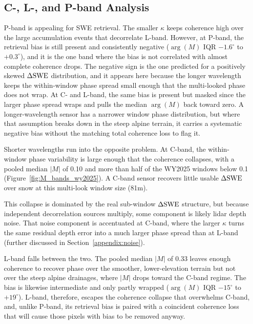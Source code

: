 \documentclass[journal abbreviation, manuscript]{copernicus}
\begin{document}
\subsection{C-, L-, and P-band Analysis}\label{subsec:band-analysis}

P-band is appealing for SWE retrieval. The smaller $\kappa$ keeps coherence high over the large accumulation events that decorrelate L-band. However, at P-band, the retrieval bias is still present and consistently negative ($\arg(M)$ IQR $-1.6^\circ$ to $+0.3^\circ$), and it is the one band where the bias is not correlated with almost complete coherence drops. The negative sign is the one predicted for a positively skewed $\Delta\mathrm{SWE}$ distribution, and it appears here because the longer wavelength keeps the within-window phase spread small enough that the multi-looked phase does not wrap. At C- and L-band, the same bias is present but masked since the larger phase spread wraps and pulls the median $\arg(M)$ back toward zero. A longer-wavelength sensor has a narrower window phase distribution, but where that assumption breaks down in the steep alpine terrain, it carries a systematic negative bias without the matching total coherence loss to flag it.

Shorter wavelengths run into the opposite problem. At C-band, the within-window phase variability is large enough that the coherence collapses, with a pooled median $|M|$ of 0.10 and more than half of the WY2025 windows below 0.1 (Figure~\ref{fig:M_bands_wy2025}). A C-band sensor recovers little usable $\Delta\mathrm{SWE}$ over snow at this multi-look window size (81m).

This collapse is dominated by the real sub-window $\Delta\mathrm{SWE}$ structure, but because independent decorrelation sources multiply, some component is likely lidar depth noise. That noise component is accentuated at C-band, where the larger $\kappa$ turns the same residual depth error into a much larger phase spread than at L-band (further discussed in Section~\ref{appendix:noise}).

L-band falls between the two. The pooled median $|M|$ of 0.33 leaves enough coherence to recover phase over the smoother, lower-elevation terrain but not over the steep alpine drainages, where $|M|$ drops toward the C-band regime. The bias is likewise intermediate and only partly wrapped ($\arg(M)$ IQR $-15^\circ$ to $+19^\circ$). L-band, therefore, escapes the coherence collapse that overwhelms C-band, and, unlike P-band, its retrieval bias is paired with a coincident coherence loss that will cause those pixels with bias to be removed anyway.
\end{document}
